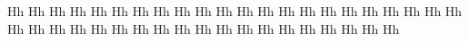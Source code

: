 \documentclass{worksheet}
\begin{document}
\begin{drillsheet}
\calligra
Hh Hh Hh Hh Hh Hh Hh Hh Hh Hh Hh Hh Hh Hh Hh Hh Hh Hh Hh Hh Hh Hh Hh Hh Hh Hh Hh Hh Hh Hh Hh Hh Hh Hh Hh Hh Hh Hh Hh Hh Hh
\end{drillsheet}
\end{document}
